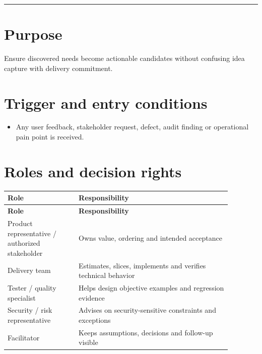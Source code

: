 \documentclass[11pt,letterpaper]{article}
\begin{document}
\tableofcontents\medskip\noindent\rule{\linewidth}{0.4pt}\medskip
\section{Purpose}
Ensure discovered needs become actionable candidates without confusing idea capture with delivery commitment.

\section{Trigger and entry conditions}
\begin{itemize}[leftmargin=*,itemsep=2pt]
\item Any user feedback, stakeholder request, defect, audit finding or operational pain point is received.
\end{itemize}
\section{Roles and decision rights}
\begin{longtable}{|p{0.28\linewidth}|p{0.60\linewidth}|}\hline
\textbf{Role} & \textbf{Responsibility} \\ \hline\endfirsthead\hline
\textbf{Role} & \textbf{Responsibility} \\ \hline\endhead
Product representative / authorized stakeholder & Owns value, ordering and intended acceptance \\ \hline
Delivery team & Estimates, slices, implements and verifies technical behavior \\ \hline
Tester / quality specialist & Helps design objective examples and regression evidence \\ \hline
Security / risk representative & Advises on security-sensitive constraints and exceptions \\ \hline
Facilitator & Keeps assumptions, decisions and follow-up visible \\ \hline
\end{longtable}
\end{document}
